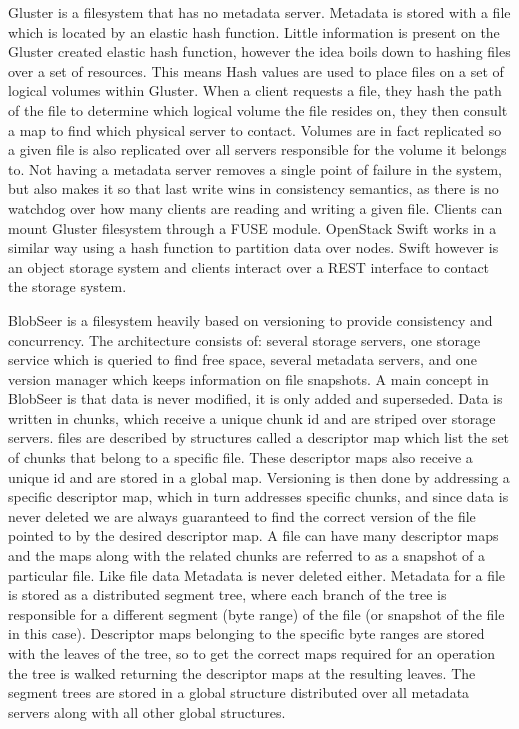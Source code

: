 Gluster \cite{Gluster} is a filesystem that has no metadata server. Metadata
is stored with a file which is located by an elastic hash function. Little
information is present on the Gluster created elastic hash function, however
the idea boils down to hashing files over a set of resources. This means Hash
values are used to place files on a set of logical volumes within Gluster.
When a client requests a file, they hash the path of the file to determine
which logical volume the file resides on, they then consult a map to find
which physical server to contact. Volumes are in fact replicated so a given
file is also replicated over all servers responsible for the volume it belongs
to. Not having a metadata server removes a single point of failure in the
system, but also makes it so that last write wins in consistency semantics, as
there is no watchdog over how many clients are reading and writing a given
file. Clients can mount Gluster filesystem through a FUSE module. OpenStack
Swift works in a similar way using a hash function to
partition data over nodes. Swift however is an object storage system and
clients interact over a REST interface to contact the storage system.


BlobSeer \cite{Nicolae2011} is a filesystem heavily based on versioning to
provide consistency and concurrency. The architecture consists of: several
storage servers, one storage service which is queried to find free space,
several metadata servers, and one version manager which keeps information on
file snapshots. A main concept in BlobSeer is that data is never modified, it
is only added and superseded. Data is written in chunks, which receive a
unique chunk id and are striped over storage servers. files are described by
structures called a descriptor map which list the set of chunks that belong to
a specific file. These descriptor maps also receive a unique id and are stored
in a global map. Versioning is then done by addressing a specific descriptor
map, which in turn addresses specific chunks, and since data is never deleted
we are always guaranteed to find the correct version of the file pointed to by
the desired descriptor map. A file can have many descriptor maps and the maps
along with the related chunks are referred to as a snapshot of a particular
file. Like file data Metadata is never deleted either. Metadata for a file is
stored as a distributed segment tree, where each branch of the tree is
responsible for a different segment (byte range) of the file (or snapshot of
the file in this case). Descriptor maps belonging to the specific byte ranges
are stored with the leaves of the tree, so to get the correct maps required
for an operation the tree is walked returning the descriptor maps at the
resulting leaves. The segment trees are stored in a global structure
distributed over all metadata servers along with all other global structures.


